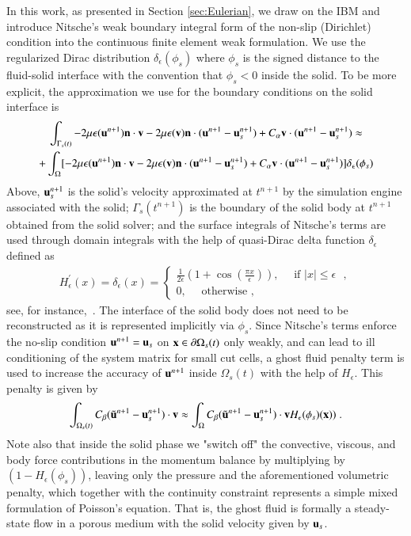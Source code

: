 \documentclass[final,3p,times]{elsarticle}
\begin{document}
In this work, as presented in Section \ref{sec:Eulerian},  we draw on the IBM and introduce Nitsche's weak boundary integral form of the non-slip (Dirichlet) condition into the continuous finite element weak formulation. We use the regularized Dirac distribution $\delta_\epsilon(\phi_s)$ where $\phi_s$ is the signed distance to the fluid-solid interface with the convention that $\phi_s <0$ inside the solid. To be more explicit, the approximation we use for the boundary conditions on the solid interface is
\begin{multline*}
   \int_{\Gamma_s(t)} -2\mu\mathbf{\epsilon}(\mathbf{u}^{n+1})\mathbf{n}\cdot\mathbf{v} 
   -2\mu\mathbf{\epsilon}(\mathbf{v})\mathbf{n}\cdot(\mathbf{u}^{n+1}-\mathbf{u}_s^{n+1}) 
   +C_\alpha\mathbf{v}\cdot(\mathbf{u}^{n+1}-\mathbf{u}_s^{n+1})\approx \\
   +\int_\Omega [-2\mu\mathbf{\epsilon}(\mathbf{u}^{n+1})\mathbf{n}\cdot\mathbf{v} 
   -2\mu\mathbf{\epsilon}(\mathbf{v})\mathbf{n}\cdot(\mathbf{u}^{n+1}-\mathbf{u}_s^{n+1}) 
   +C_\alpha\mathbf{v}\cdot(\mathbf{u}^{n+1}-\mathbf{u}_s^{n+1})]\delta_\epsilon(\phi_s)
\end{multline*}
Above, $\mathbf{u}_s^{n+1}$ is the solid's velocity approximated at $t^{n+1}$ by the simulation engine associated with the solid; $\Gamma_s(t^{n+1})$ is the boundary 
of the solid body at $t^{n+1}$ obtained from the solid solver; and the surface integrals of Nitsche's terms are used through domain integrals with the help 
of quasi-Dirac delta function $\delta_\epsilon$ defined as
\begin{align*}
H^{'}_{\epsilon}(x) = \delta_{\epsilon}(x)=\begin{cases}
\frac{1}{2\epsilon}(1+\cos(\frac{\pi x}{\epsilon})), \quad\text{ if $|x|\leq \epsilon$ },\\
0,\quad\text{ otherwise },
\end{cases}
\end{align*}
see, for instance,~\cite{Sussman1994}. The interface of the solid body does not need to be reconstructed as it is represented implicitly via $\phi_s$. Since Nitsche's terms enforce the no-slip condition $\mathbf{u}^{n+1}=\mathbf{u}_s$ on $\mathbf{x}\in\partial\Omega_s(t)$ only weakly, and can lead to ill conditioning of the system matrix for small cut cells, a ghost fluid penalty term is used to increase the accuracy of $\mathbf{u}^{n+1}$ inside $\Omega_s(t)$ with the help of $H_\epsilon$. This penalty is given by
\begin{equation*}
\int_{\Omega_s(t)} C_\beta (\tilde{\mathbf{u}}^{n+1}-\mathbf{u}_s^{n+1})\cdot\mathbf{v}  \approx 
\int_\Omega C_\beta (\tilde{\mathbf{u}}^{n+1}-\mathbf{u}_s^{n+1})\cdot\mathbf{v} H_\epsilon(\phi_s)(\mathbf{x})) \; .
\end{equation*}
Note also that inside the solid phase we "switch off" the convective, viscous, and body force contributions in the momentum balance by multiplying by $(1-H_{\epsilon}(\phi_s))$, leaving only the pressure and the aforementioned volumetric penalty, which together with the continuity constraint represents a simple mixed formulation of Poisson's equation. That is, the ghost fluid is formally a steady-state flow in a porous medium with the solid velocity given by $\mathbf{u}_s$.
\end{document}
